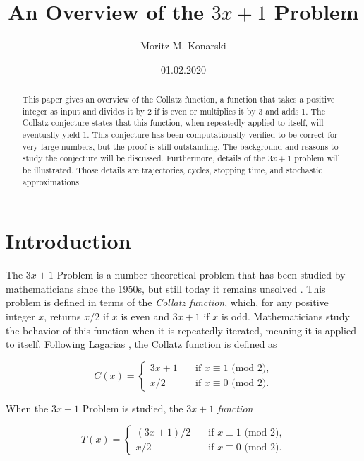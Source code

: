 \documentclass[12pt,a4paper,reqno]{amsart}
\title{An Overview of the $3x+1$ Problem}
\author{Moritz M. Konarski}
\date{01.02.2020}
\begin{document}
\begin{abstract}
    This paper gives an overview of the Collatz function, a function that takes
    a positive integer as input and divides it by 2 if is even or multiplies
    it by 3 and adds 1. The Collatz conjecture states that this function, when
    repeatedly applied to itself, will eventually yield 1. This conjecture has
    been computationally verified to be correct for very large numbers, but the
    proof is still outstanding. The background and reasons to study the
    conjecture will be discussed. Furthermore, details of the $3x+1$ problem
    will be illustrated. Those details are trajectories, cycles, stopping time,
    and stochastic approximations. 
\end{abstract}

\maketitle
\tableofcontents


\section{Introduction}

The $3x+1$ Problem is a number theoretical problem that has been studied by 
mathematicians since the 1950s, but still
today it remains unsolved \cite{src:03}. This problem is defined in terms of
the \textit{Collatz function}, which, for any positive integer $x$, returns
$x/2$ if $x$ is even and $3x+1$ if $x$ is odd. Mathematicians study the
behavior of this function when it is repeatedly iterated, meaning it is applied
to itself. Following Lagarias \cite{src:03}, the Collatz function is defined as 

\begin{equation}
C(x)= \left\{
    \begin{array}{ll}
        3x+1 \quad &\text{if } x \equiv 1 \text{ (mod 2),} \\
        x/2 \quad &\text{if } x \equiv 0 \text{ (mod 2).}
    \end{array}
\right.
\label{eq:01}
\end{equation}

When the $3x+1$ Problem is studied, the \textit{$3x+1$ function} 

\begin{equation}
T(x)= \left\{
    \begin{array}{ll}
        (3x+1)/2 \quad &\text{if } x \equiv 1 \text{ (mod 2),} \\
        x/2 \quad &\text{if } x \equiv 0 \text{ (mod 2)}.
    \end{array}
\right.
\label{eq:02}
\end{equation}
\end{document}
